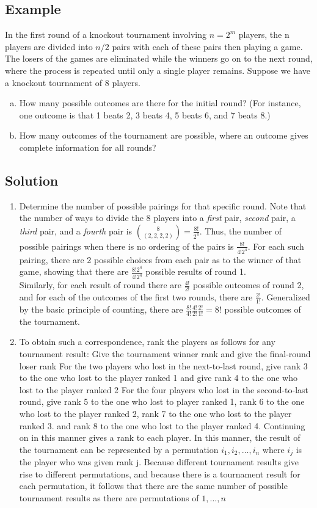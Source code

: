 \subsection*{Example}
In the first round of a knockout tournament involving $n=2^m$ players, the n players are divided into $n/2$ pairs with each of these pairs then playing a game.
The losers of the games are eliminated while the winners go on to the next
round, where the process is repeated until only a single player remains. Suppose
we have a knockout tournament of 8 players.
\begin{enumerate} [a. ]
    \item How many possible outcomes are there for the initial round? (For instance, one outcome is that 1 beats 2, 3 beats 4, 5 beats 6, and 7 beats 8.)
    \item How many outcomes of the tournament are possible, where an outcome gives complete information for all rounds?
\end{enumerate}
\subsection*{Solution}
\begin{enumerate}
    \item Determine the number of possible pairings for that specific round. Note that the number of ways to divide the 8 players into a \textit{first} pair, \textit{second} pair, a \textit{third} pair, and a \textit{fourth} pair is ${8\choose (2,2,2,2)} = \frac{8!}{2^4}$. Thus, the number of possible pairings
when there is no ordering of the pairs is $\frac{8!}{4!2^4}$. For each such pairing, there are
2 possible choices from each pair as to the winner of that game, showing that there are $\frac{8!2^4}{4!2^4}$ possible results of round 1. \\Similarly, for each result of round there are $\frac{4!}{2!}$ possible outcomes of round 2, and for each of the outcomes of the first two rounds, there are $\frac{2!}{1!}$. Generalized by the basic principle of counting, there are $\frac{8!}{4!}\frac{4!}{2!}\frac{2!}{1!} = 8!$ possible outcomes of the tournament. 
    \item To obtain such a correspondence, rank the players as follows for any tournament result: Give the tournament winner rank and give the final-round loser rank For the two players who lost in the next-to-last round, give rank 3 to the one who lost to the player ranked 1 and give rank 4 to the one who lost to the player ranked 2 For the four players who lost in the second-to-last round, give rank 5 to the one who lost to player ranked 1, rank 6 to the one who lost to the player ranked 2, rank 7 to the one who lost to the player ranked 3. and rank 8 to the one who lost to the player ranked 4. Continuing on in this manner gives a rank to each player. In this manner, the result of the tournament can be represented by a permutation $i_1,i_2,\dots,i_n$ where $i_j$ is the player who was given rank j. Because different tournament results give rise to different permutations, and because there is a tournament result for each permutation, it follows that there are the same number of possible tournament results as there are permutations of $1,\dots, n$
\end{enumerate}